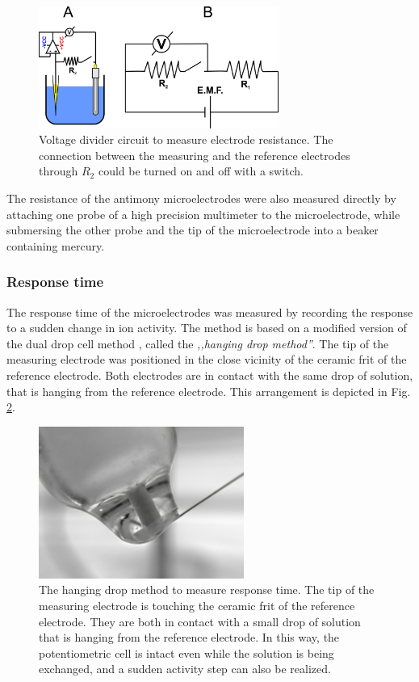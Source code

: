 \begin{figure}
\centering
\includegraphics[width=0.7\textwidth]{img/divider_switch.jpg}
\caption[Voltage divider circuit to measure electrode resistance]{Voltage divider circuit to measure electrode resistance.
The connection between the measuring and the reference electrodes through $R_2$ could be turned on and off with a switch.} 
\label{fig:divider}
\end{figure}

The resistance of the antimony microelectrodes were also measured directly by attaching one probe of a high precision multimeter to the microelectrode, while submersing the other probe and the tip of the microelectrode into a beaker containing mercury.

			\subsubsection{Response time}
The response time of the microelectrodes was measured by recording the response to a sudden change in ion activity. The method is based on a modified version of the dual drop cell method \cite{lamaka2009novel}, called the \emph{,,hanging drop method''}.
The tip of the measuring electrode was positioned in the close vicinity of the ceramic frit of the reference electrode. Both electrodes are in contact with the same drop of solution, that is hanging from the reference electrode. This arrangement is depicted in Fig. \ref{fig:hanging}.

\begin{figure}
\centering
\includegraphics[width=0.6\textwidth]{img/hanging.jpg}
\caption[The hanging drop method]{The hanging drop method to measure response time.
The tip of the measuring electrode is touching the ceramic frit of the reference electrode. They are both in contact with a small drop of solution that is hanging from the reference electrode. In this way, the potentiometric cell is intact even while the solution is being exchanged, and a sudden activity step can also be realized.} 
\label{fig:hanging}
\end{figure}

